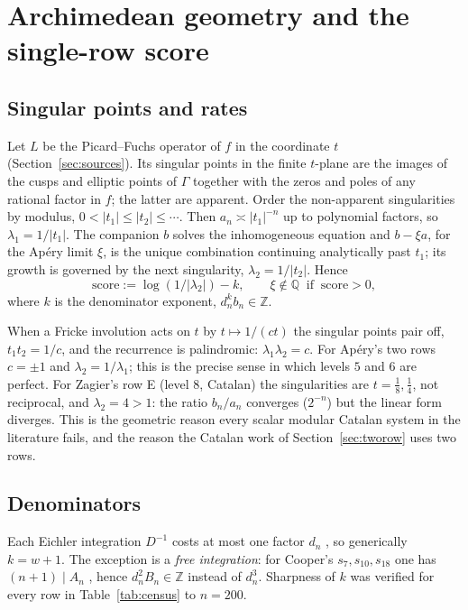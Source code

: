 \section{Archimedean geometry and the single-row score}\label{sec:arch}

\subsection{Singular points and rates}
Let $L$ be the Picard--Fuchs operator of $f$ in the coordinate $t$ (Section~\ref{sec:sources}). Its singular points in the finite $t$-plane are the images of the cusps and elliptic points of $\Gamma$ together with the zeros and poles of any rational factor in $f$; the latter are apparent. Order the non-apparent singularities by modulus, $0<|t_1|\le|t_2|\le\cdots$. Then $a_n\asymp|t_1|^{-n}$ up to polynomial factors, so $\lambda_1=1/|t_1|$. The companion $b$ solves the inhomogeneous equation and $b-\xi a$, for the Ap\'ery limit $\xi$, is the unique combination continuing analytically past $t_1$; its growth is governed by the next singularity, $\lambda_2=1/|t_2|$. Hence
\[
\text{score}:=\log(1/|\lambda_2|)-k,
\qquad
\xi\notin\mathbb Q\ \text{ if }\ \text{score}>0,
\]
where $k$ is the denominator exponent, $d_n^kb_n\in\mathbb Z$.

When a Fricke involution acts on $t$ by $t\mapsto1/(ct)$ the singular points pair off, $t_1t_2=1/c$, and the recurrence is palindromic: $\lambda_1\lambda_2=c$. For Ap\'ery's two rows $c=\pm1$ and $\lambda_2=1/\lambda_1$; this is the precise sense in which levels $5$ and $6$ are perfect. For Zagier's row E (level $8$, Catalan) the singularities are $t=\tfrac18,\tfrac14$, not reciprocal, and $\lambda_2=4>1$: the ratio $b_n/a_n$ converges ($2^{-n}$) but the linear form diverges. This is the geometric reason every scalar modular Catalan system in the literature fails, and the reason the Catalan work of Section~\ref{sec:tworow} uses two rows.

\subsection{Denominators}\label{sec:denoms}
Each Eichler integration $D^{-1}$ costs at most one factor $d_n$ \cite{ProjDomb}, so generically $k=w+1$. The exception is a \emph{free integration}: for Cooper's $s_7,s_{10},s_{18}$ one has $(n+1)\mid A_n$ \cite{Bogner2013}, hence $d_n^{2}B_n\in\mathbb Z$ instead of $d_n^3$. Sharpness of $k$ was verified for every row in Table~\ref{tab:census} to $n=200$.

